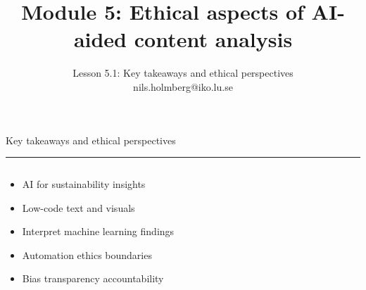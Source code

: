 \documentclass[aspectratio=169]{beamer}
\title{Module 5: Ethical aspects of AI-aided content analysis}
\subtitle{Lesson 5.1: Key takeaways and ethical perspectives \\[0.8em]nils.holmberg@iko.lu.se}
\author{}
\newcommand{\TitleFont}{\rmfamily}
\begin{document}
\begin{frame}[plain]
  \titlepage
\end{frame}
\setcounter{framenumber}{0} %

\begin{frame}[t]{}
  \vspace*{0.5cm}
  {\TitleFont\fontsize{18}{22}\selectfont\color{LUBronze}Key takeaways and ethical perspectives\par}
  \vspace{0.3em}
  {\color{LUBronze}\rule{\linewidth}{0.8pt}}\par
  \vspace{0.2cm}
  \begin{columns}[t]
    \begin{column}[t]{0.4\textwidth}
      \vspace*{0pt}
      \begin{itemize}\setlength\itemsep{0.65em}
        \item AI for sustainability insights
        \item Low-code text and visuals
        \item Interpret machine learning findings
        \item Automation ethics boundaries
        \item Bias transparency accountability
      \end{itemize}
    \end{column}
  \end{columns}
\end{frame}
\end{document}
